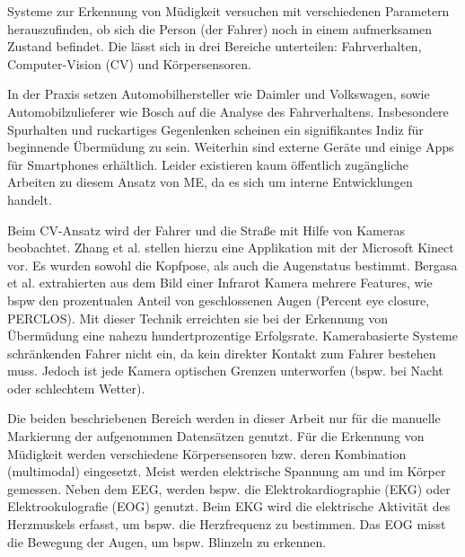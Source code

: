 \label{chap:state}
Systeme zur Erkennung von Müdigkeit versuchen mit verschiedenen Parametern herauszufinden, ob sich die Person (der Fahrer) noch in einem aufmerksamen Zustand befindet. Die lässt sich in drei Bereiche unterteilen: Fahrverhalten, Computer-Vision (CV) und Körpersensoren. 

In der Praxis setzen Automobilhersteller wie Daimler\cite{Daimler} und Volkswagen, sowie Automobilzulieferer wie Bosch\cite{Bosch} auf die Analyse des Fahrverhaltens. Insbesondere Spurhalten und ruckartiges Gegenlenken scheinen ein signifikantes Indiz für beginnende Übermüdung zu sein. Weiterhin sind externe Geräte und einige Apps für Smartphones erhältlich. Leider existieren kaum öffentlich zugängliche Arbeiten zu diesem Ansatz von  \acl{ME}, da es sich um interne Entwicklungen handelt. 

Beim CV-Ansatz wird der Fahrer und die Straße mit Hilfe von Kameras beobachtet. Zhang et al. \cite{Zhang:2015:RSD:2753829.2629482} stellen hierzu eine Applikation mit der Microsoft Kinect vor. Es wurden sowohl die Kopfpose, als auch die Augenstatus bestimmt. Bergasa et al. \cite{Bergasa_1603553} extrahierten aus dem Bild einer Infrarot Kamera mehrere Features, wie \acl{bspw} den prozentualen Anteil von geschlossenen Augen (Percent eye closure, PERCLOS). Mit dieser Technik erreichten sie bei der Erkennung von Übermüdung eine nahezu hundertprozentige Erfolgsrate. Kamerabasierte Systeme schränkenden Fahrer nicht ein, da kein direkter Kontakt zum Fahrer bestehen muss. Jedoch ist jede Kamera optischen Grenzen unterworfen (bspw. bei Nacht oder schlechtem Wetter).

Die beiden beschriebenen Bereich werden in dieser Arbeit nur für die manuelle Markierung der aufgenommen Datensätzen genutzt. Für die Erkennung von Müdigkeit werden verschiedene Körpersensoren bzw. deren Kombination (multimodal) eingesetzt. Meist werden elektrische Spannung am und im Körper gemessen. Neben dem EEG, werden bspw. die Elektrokardiographie (EKG) oder Elektrookulografie (EOG) genutzt. Beim EKG wird die elektrische Aktivität des Herzmuskels erfasst, um bspw. die  Herzfrequenz zu bestimmen. Das EOG misst die Bewegung der Augen, um bspw. Blinzeln zu erkennen.

